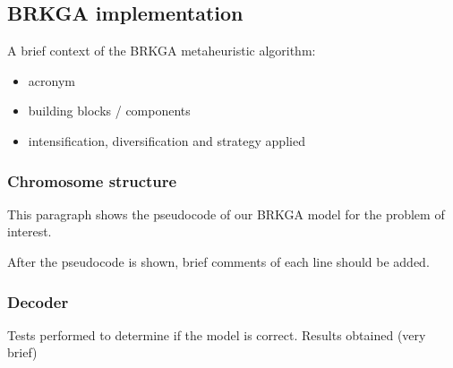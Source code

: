 \subsection{BRKGA implementation}

A brief context of the BRKGA metaheuristic algorithm:
\begin{itemize}
	\item acronym
	\item building blocks / components
	\item intensification, diversification and strategy applied
\end{itemize}

\subsubsection{Chromosome structure}

This paragraph shows the pseudocode of our BRKGA model for the problem of interest.

After the pseudocode is shown, brief comments of each line should be added.



\subsubsection{Decoder}

Tests performed to determine if the model is correct. Results obtained (very brief)



\pagebreak